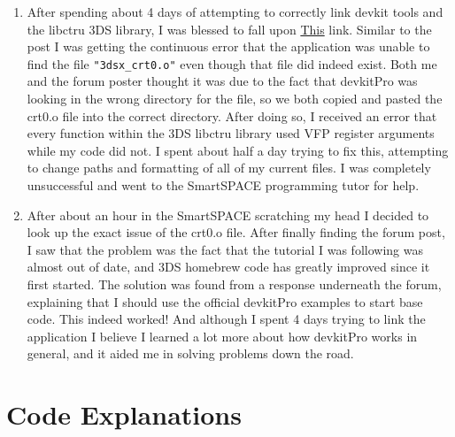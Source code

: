 \documentclass{article}
\begin{document}
\begin{itemize}
    \begin{enumerate}
        \item After spending about 4 days of attempting to correctly link devkit tools and the libctru 3DS library, I was blessed to fall upon \href{https://devkitpro.org/viewtopic.php?t=8997}{This} link. Similar to the post I was getting the continuous error that the application was unable to find the file \verb|"3dsx_crt0.o"| even though that file did indeed exist. Both me and the forum poster thought it was due to the fact that devkitPro was looking in the wrong directory for the file, so we both copied and pasted the crt0.o file into the correct directory. After doing so, I received an error that every function within the 3DS libctru library used VFP register arguments while my code did not. I spent about half a day trying to fix this, attempting to change paths and formatting of all of my current files. I was completely unsuccessful and went to the SmartSPACE programming tutor for help. 
        \item After about an hour in the SmartSPACE scratching my head I decided to look up the exact issue of the crt0.o file. After finally finding the forum post, I saw that the problem was the fact that the tutorial I was following was almost out of date, and 3DS homebrew code has greatly improved since it first started. The solution was found from a response underneath the forum, explaining that I should use the official devkitPro examples to start base code. This indeed worked! And although I spent 4 days trying to link the application I believe I learned a lot more about how devkitPro works in general, and it aided me in solving problems down the road.
    \end{enumerate}
\end{itemize}



\section{Code Explanations}
\end{document}
